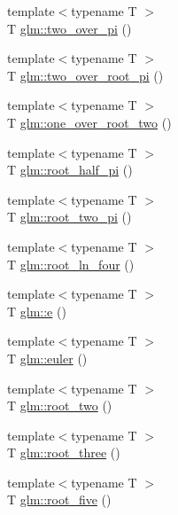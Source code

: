 \begin{DoxyCompactItemize}
\item 
{\footnotesize template$<$typename T $>$ }\\\-T \hyperlink{group__gtx__constants_ga0414abfb9d780e5d6b96761785f8e842}{glm\-::two\-\_\-over\-\_\-pi} ()
\item 
{\footnotesize template$<$typename T $>$ }\\\-T \hyperlink{group__gtx__constants_ga9fd47e013242a878c1a116df44c9411b}{glm\-::two\-\_\-over\-\_\-root\-\_\-pi} ()
\item 
{\footnotesize template$<$typename T $>$ }\\\-T \hyperlink{group__gtx__constants_ga78ff8358b2c08b7bfb156e2688043c48}{glm\-::one\-\_\-over\-\_\-root\-\_\-two} ()
\item 
{\footnotesize template$<$typename T $>$ }\\\-T \hyperlink{group__gtx__constants_ga274427c1168326de2375b984bd636479}{glm\-::root\-\_\-half\-\_\-pi} ()
\item 
{\footnotesize template$<$typename T $>$ }\\\-T \hyperlink{group__gtx__constants_ga63eb900e4144d057fa250932c0d876af}{glm\-::root\-\_\-two\-\_\-pi} ()
\item 
{\footnotesize template$<$typename T $>$ }\\\-T \hyperlink{group__gtx__constants_gaf5d00f6fd6c5d43d8fe2f5f28f3f681c}{glm\-::root\-\_\-ln\-\_\-four} ()
\item 
{\footnotesize template$<$typename T $>$ }\\\-T \hyperlink{group__gtx__constants_gaa189b598f95c996961eab8765aa9feb5}{glm\-::e} ()
\item 
{\footnotesize template$<$typename T $>$ }\\\-T \hyperlink{group__gtx__constants_gaf57977dcb1a4783b5dc09bc8fb71162f}{glm\-::euler} ()
\item 
{\footnotesize template$<$typename T $>$ }\\\-T \hyperlink{group__gtx__constants_ga4a430ec7bd363dbd34948d4b51da11e2}{glm\-::root\-\_\-two} ()
\item 
{\footnotesize template$<$typename T $>$ }\\\-T \hyperlink{group__gtx__constants_gaf7fe63c1ad491999f13c05b64794e09c}{glm\-::root\-\_\-three} ()
\item 
{\footnotesize template$<$typename T $>$ }\\\-T \hyperlink{group__gtx__constants_ga67f9ec62c2b49ed71766f05ece8ccb84}{glm\-::root\-\_\-five} ()
\item 

\end{DoxyCompactItemize}
